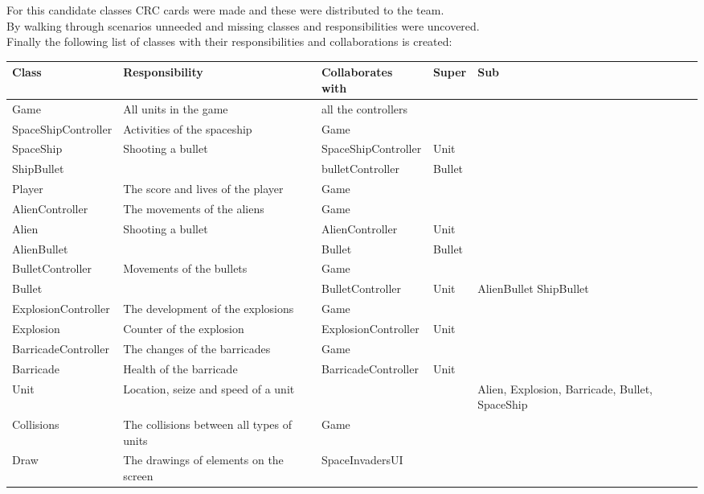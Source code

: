 \documentclass[10pt]{article}
\begin{document}
 \pagebreak
For this candidate classes CRC cards were made and these were distributed to the team. \\
By walking through scenarios unneeded and missing classes and responsibilities were uncovered.\\
Finally the following list of classes with their responsibilities and collaborations is created:
\begin{center}
    \begin{tabular}{ | p{3cm} | p{5cm} | p{3cm} | p{2cm} | p{2cm} |}
  \hline
    Class & Responsibility & Collaborates with & Super & Sub \\ \hline
   Game & All units in the game & all the controllers & & \\ \hline
   SpaceShipController & Activities of the spaceship & Game & & \\ \hline
  SpaceShip & Shooting a bullet & SpaceShipController & Unit & \\ \hline
  ShipBullet& & bulletController & Bullet & \\ \hline
   Player & The score and lives of the player & Game & & \\ \hline
  AlienController & The movements of the aliens & Game & &  \\  \hline
   Alien & Shooting a bullet  & AlienController & Unit &  \\  \hline
   AlienBullet & & Bullet & Bullet &  \\  \hline
   BulletController & Movements of the bullets & Game & &  \\  \hline
   Bullet & &  BulletController & Unit & AlienBullet ShipBullet \\  \hline
   ExplosionController & The development of the explosions & Game & &  \\  \hline
  Explosion & Counter of the explosion & ExplosionController & Unit &  \\  \hline
  BarricadeController & The changes of the barricades & Game & &  \\  \hline
  Barricade & Health of the barricade & BarricadeController & Unit &  \\  \hline
  Unit & Location, seize and speed of a unit &  & & Alien, Explosion, Barricade, Bullet, SpaceShip  \\  \hline
  Collisions & The collisions between all types of units  & Game & &  \\  \hline
  Draw  & The drawings of elements on the screen & SpaceInvadersUI & &  \\  \hline

\end{tabular}
\end{center}
\end{document}
